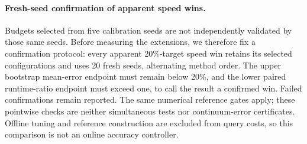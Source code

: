 \paragraph{Fresh-seed confirmation of apparent speed wins.}
Budgets selected from five calibration seeds are not independently validated
by those same seeds. Before measuring the extensions, we therefore fix a
confirmation protocol: every apparent 20\%-target speed win retains its
selected configurations and uses 20 fresh seeds, alternating method order.
The upper bootstrap mean-error endpoint must remain below 20\%, and the
lower paired runtime-ratio endpoint must exceed one, to call the result a
confirmed win. Failed confirmations remain reported. The same numerical
reference gates apply; these pointwise checks are neither simultaneous tests
nor continuum-error certificates. Offline tuning and reference construction
are excluded from query costs, so this comparison is not an online accuracy
controller.
